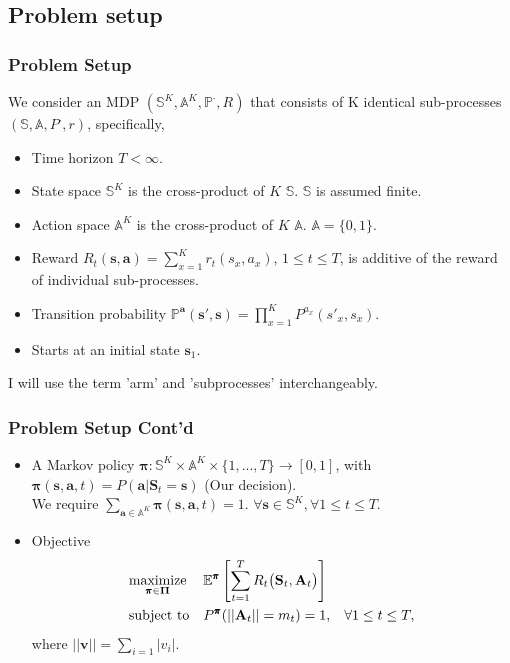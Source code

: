 \documentclass{beamer}
\newcommand{\av}{\mathbf{a}}
\newcommand{\allp}{\pmb{\pi}}
\newcommand{\allpset}{\mathbf{\Pi}}
\newcommand{\allstates}{\mathbb{S}^K}
\newcommand{\allstate}{\mathbf{s}}
\newcommand{\allstater}{\mathbf{S}}
\newcommand{\allactions}{\mathbb{A}^K}
\newcommand{\allaction}{\av}
\newcommand{\allar}{\mathbf{A}}
\newcommand{\allpr}{\mathbb{P}}
\newcommand{\allr}{R}
\newcommand{\subr}{r}
\newcommand{\substates}{\mathbb{S}}
\newcommand{\substate}{s}
\newcommand{\subactions}{\mathbb{A}}
\newcommand{\subpr}{P}
\newcommand{\subaction}{a}
\begin{document}
\subsection{Problem setup}
\begin{frame}[plain]
\frametitle{Problem Setup}
We consider an MDP $(\allstates,\allactions,\allpr^{\cdot},\allr)$ that consists of K identical sub-processes $(\substates,\subactions,\subpr^{\cdot},\subr)$, specifically,
\begin{itemize}
\item Time horizon $T<\infty$.
\item State space $\allstates$ is the cross-product of $K$ $\substates$. $\substates$ is assumed finite.
\item Action space $\allactions$ is the cross-product of $K$ $\subactions$. $\subactions=\{0,1\}$.
\item Reward $\allr_t(\allstate,\allaction) = \sum_{x=1}^K \subr_t(\substate_x,\subaction_x)$, $1\leq t\leq T$, is additive of the reward of individual sub-processes.
\item Transition probability $\allpr^{\allaction}(\allstate',\allstate) = \prod_{x=1}^{K}\subpr^{\subaction_x}(\substate'_x,\substate_x)$.
\item Starts at an initial state $\allstate_1$.
\end{itemize}
I will use the term 'arm' and 'subprocesses' interchangeably.
\end{frame}

\begin{frame}[plain]
\frametitle{Problem Setup Cont'd}
\begin{itemize}
\item A Markov policy $\allp:\allstates\times \allactions \times \{1,...,T\} \rightarrow [0,1]$, with $\allp(\allstate,\allaction,t) = P(\allaction|\allstater_t=\allstate)$ (Our decision).\\ We require $\sum_{\allaction\in\allactions}\allp(\allstate,\allaction,t)=1$.
$\forall \allstate\in\allstates, \forall 1\leq t\leq T$.
\item Objective
\begin{equation}\label{prime}
\begin{aligned}
& \underset{\allp\in\allpset}{\text{maximize}}
& & \mathbb{E}^{\allp}\left[\sum_{t=1}^{T}\allr_t\big(\allstater_t,\allar_t\big)\right] \\
& \text{subject to}
& & P^{\allp}(||\allar_t||=m_t)=1, \hspace{3mm}\forall 1\leq t\leq T,
\end{aligned}
\end{equation}
where $||\mathbf{v}|| = \sum_{i=1}|v_i|$.
\end{itemize}
\end{frame}
\end{document}
